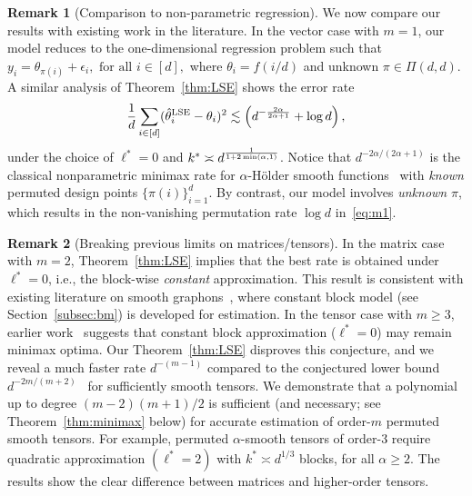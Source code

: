 \documentclass[12pt]{article}
\theoremstyle{definition}
\newtheorem{rmk}{Remark}
\begin{document}
\begin{rmk}[Comparison to non-parametric regression]
We now compare our results with existing work in the literature. In the vector case with $m = 1$,  our model reduces to the one-dimensional regression problem such that
$y_i  = \theta_{\pi(i)}+\epsilon_i, \text{ for all } i\in [d],$
where $\theta_i=f(i/d)$ and unknown $\pi \in \Pi(d,d)$.
A similar analysis of Theorem~\ref{thm:LSE} shows the error rate
\begin{align}\label{eq:m1}
    \frac{1}{d}\sum_{i\in[d]}(\hat\theta_i^{\text{LSE}}-\theta_i)^2 \lesssim \left(d^{-{2\alpha\over 2\alpha+1}}+\log d\right),
\end{align}
under the choice of $\ell^* = 0$ and $k^* \asymp d^{1\over 1+2\min(\alpha,1)}$.
Notice that  $d^{-2\alpha/(2\alpha+1)}$ is the  classical nonparametric minimax rate for $\alpha$-Hölder smooth functions~\citep{tsybakov2009introduction} with \emph{known} permuted design points $\{\pi(i)\}_{i=1}^d$. By contrast, our model involves \emph{unknown} $\pi$, which results in the non-vanishing permutation rate $\log d$ in~\eqref{eq:m1}.
\end{rmk}

\begin{rmk}[Breaking previous limits on matrices/tensors]
In the matrix case with $m=2$, Theorem~\ref{thm:LSE} implies that the best rate is obtained under $\ell^*=0$, i.e., the block-wise \emph{constant} approximation. This result is consistent with existing literature on smooth graphons~\cite{bickel2009nonparametric,gao2015rate,klopp2017oracle}, where constant block model (see Section~\ref{subsec:bm}) is developed for estimation. In the tensor case with $m\geq 3$, earlier work~\cite{balasubramanian2021nonparametric} suggests that constant block approximation ($\ell^*=0$) may remain minimax optima. Our Theorem~\ref{thm:LSE} disproves this conjecture, and we reveal a much faster rate $d^{-(m-1)}$ compared to the conjectured lower bound $d^{-2m/( m+2)}$~\cite{balasubramanian2021nonparametric} for sufficiently smooth tensors. We demonstrate that a polynomial up to degree $(m-2)(m+1)/2$ is sufficient (and necessary; see Theorem~\ref{thm:minimax} below) for accurate estimation of order-$m$ permuted smooth tensors. 
For example, permuted $\alpha$-smooth tensors of order-3 require quadratic approximation $(\ell^*=2)$ with $k^*\asymp d^{1/3}$ blocks, for all $\alpha\geq 2$. The results show the clear difference between matrices and higher-order tensors. 
\end{rmk}
\end{document}
